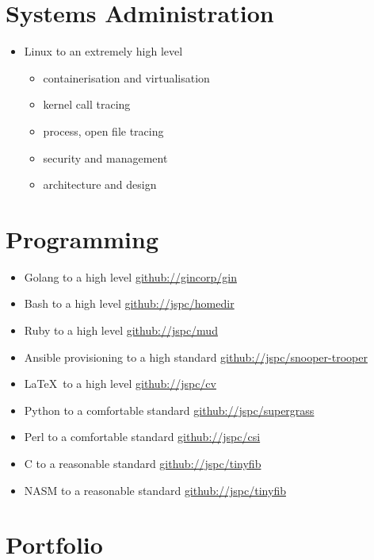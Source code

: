 \documentclass[11pt,a4paper,sans]{article}
\begin{document}
\section{Systems Administration}

\begin{itemize}
\item Linux to an extremely high level
  \begin{itemize}
  \item containerisation and virtualisation
  \item kernel call tracing
  \item process, open file tracing
  \item security and management
  \item architecture and design
  \end{itemize}
\end{itemize}

\section{Programming}

\begin{itemize}
\item Golang to a high level \href{https://github.com/gincorp/gin}{github://gincorp/gin}
\item Bash to a high level \href{https://github.com/jspc/homedir}{github://jspc/homedir}
\item Ruby to a high level \href{https://github.com/jspc/mud}{github://jspc/mud}
\item Ansible provisioning to a high standard \href{https://github.com/jspc/snooper-trooper}{github://jspc/snooper-trooper}
\item \LaTeX \ to a high level \href{https://github.com/jspc/cv}{github://jspc/cv}
\item Python to a comfortable standard \href{https://github.com/jspc/supergrass}{github://jspc/supergrass}
\item Perl to a comfortable standard \href{https://github.com/jspc/csi}{github://jspc/csi}
\item C to a reasonable standard \href{https://github.com/jspc/tinyfib}{github://jspc/tinyfib}
\item NASM to a reasonable standard \href{https://github.com/jspc/tinyfib}{github://jspc/tinyfib}
\end{itemize}

\section{Portfolio}
\end{document}
